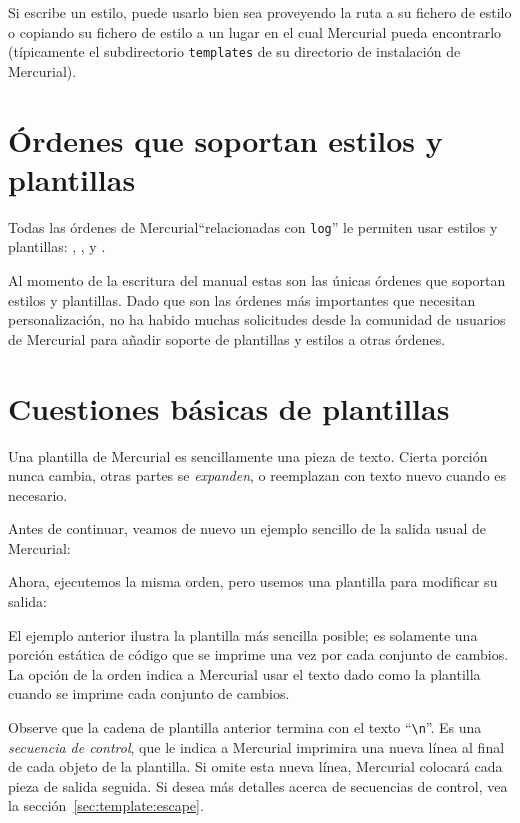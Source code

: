 Si escribe un estilo, puede usarlo bien sea proveyendo la ruta a su
fichero de estilo o copiando su fichero de estilo a un lugar en el
cual Mercurial pueda encontrarlo (típicamente el subdirectorio
\texttt{templates} de su directorio de instalación de Mercurial).

\section{Órdenes que soportan estilos y plantillas}

Todas las órdenes de Mercurial``relacionadas con \texttt{log}'' le
permiten usar estilos y plantillas: , ,
 y .

Al momento de la escritura del manual estas son las únicas órdenes que
soportan estilos y plantillas.  Dado que son las órdenes más
importantes que necesitan personalización, no ha habido muchas
solicitudes desde la comunidad de usuarios de Mercurial para añadir
soporte de plantillas y estilos a otras órdenes.

\section{Cuestiones básicas de plantillas}

Una plantilla de Mercurial es sencillamente una pieza de texto.
Cierta porción nunca cambia, otras partes se \emph{expanden}, o
reemplazan con texto nuevo cuando es necesario.

Antes de continuar, veamos de nuevo un ejemplo sencillo de la salida
usual de Mercurial:


Ahora, ejecutemos la misma orden, pero usemos una plantilla para
modificar su salida:


El ejemplo anterior ilustra la plantilla más sencilla posible;  es
solamente una porción estática de código que se imprime una vez por
cada conjunto de cambios.  La opción  de la
orden  indica a Mercurial usar el texto dado como la
plantilla cuando se imprime cada conjunto de cambios.

Observe que la cadena de plantilla anterior termina con el texto
``\Verb+\n+''.  Es una \emph{secuencia de control}, que le indica a
Mercurial imprimira una nueva línea al final de cada objeto de la
plantilla.  Si omite esta nueva línea, Mercurial colocará cada pieza
de salida seguida.  Si desea más detalles acerca de secuencias de
control, vea la sección~\ref{sec:template:escape}.

